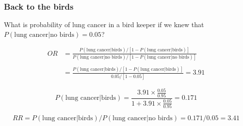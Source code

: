 
\begin{frame}
\frametitle{Back to the birds}

What is probability of lung cancer in a bird keeper if we knew that $P(\text{lung cancer}|\text{no birds}) = 0.05$?

\begin{align*}
OR &= \frac{P(\text{lung cancer} | \text{birds}) / [1-P(\text{lung cancer} | \text{birds})]}{P(\text{lung cancer} | \text{no birds})/[1-P(\text{lung cancer} | \text{no birds})]} \\
\\
   &= \frac{P(\text{lung cancer} | \text{birds}) / [1-P(\text{lung cancer} | \text{birds})]}{0.05/[1-0.05]} = 3.91
\end{align*}

\pause

\[ P(\text{lung cancer} | \text{birds}) =  \frac{3.91 \times \frac{0.05}{0.95}}{1+3.91 \times \frac{0.05}{0.95}} = 0.171\]

\pause

\[ RR = P(\text{lung cancer} | \text{birds}) / P(\text{lung cancer} | \text{no birds}) = 0.171 / 0.05 = 3.41\]

\end{frame}


